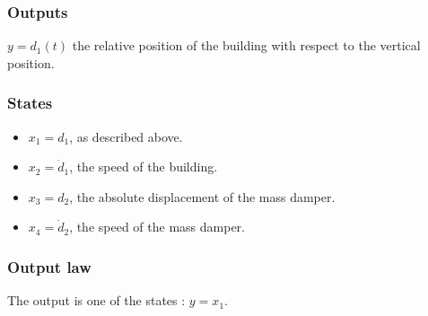 \documentclass[a4paper, 12pt]{article}
\begin{document}
    \subsubsection{Outputs}
    $y = d_1(t)$ the relative position of the building with respect to the vertical position.
    
    \subsubsection{States}
    \begin{itemize}
        \item $x_1 = d_1$, as described above.
        \item $x_2 = \dot d_1$, the speed of the building.
        \item $x_3 = d_2$, the absolute displacement of the mass damper.
        \item $x_4 = \dot d_2$, the speed of the mass damper.
    \end{itemize}
    
    \subsubsection{Output law}
    The output is one of the states : $y = x_1$.
    
\end{document}
